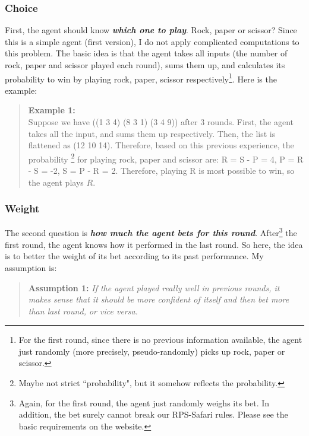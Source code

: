 \documentclass[10pt]{article}
\begin{document}
\subsubsection{Choice}
First, the agent should know \textbf{\textit{which one to play}}. Rock, paper or scissor? Since this is a simple agent (first version), I do not apply complicated computations to this problem. The basic idea is that the agent takes all inputs (the number of rock, paper and scissor played each round), sums them up, and calculates its probability to win by playing rock, paper, scissor respectively\footnote{For the first round, since there is no previous information available, the agent just randomly (more precisely, pseudo-randomly) picks up rock, paper or scissor.}. Here is the example:
\begin{quote}
\textbf{Example 1:}\\
Suppose we have ((1 3 4) (8 3 1) (3 4 9)) after 3 rounds. First, the agent takes all the input, and sums them up respectively. Then, the list is flattened as (12 10 14). Therefore, based on this previous experience, the probability \footnote{Maybe not strict ``probability", but it somehow reflects the probability.} for playing rock, paper and scissor are: R = S - P = 4, P = R - S = -2, S = P - R = 2. Therefore, playing R is most possible to win, so the agent plays $R$.
\end{quote}

\subsubsection{Weight}
The second question is \textbf{\textit{how much the agent bets for this round}}. After\footnote{Again, for the first round, the agent just randomly weighs its bet. In addition, the bet surely cannot break  our RPS-Safari rules. Please see the basic requirements on the website.} the first round, the agent knows how it performed in the last round. So here, the idea is to better the weight of its bet according to its past performance. My assumption is:
\begin{quote}
\textbf{Assumption 1:} \textit{If the agent played really well in previous rounds, it makes sense that it should be more confident of itself and then bet more than last round, or vice versa.}
\end{quote}
\end{document}
